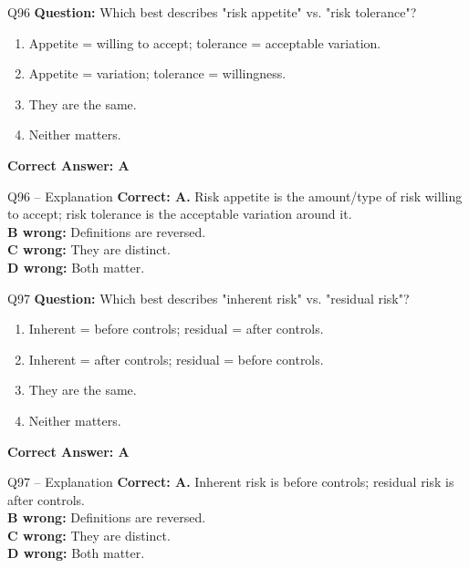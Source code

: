 \documentclass[aspectratio=169,10pt]{beamer}
\begin{document}
	\begin{frame}[t]{Q96}
		\small
		\textbf{Question:} Which best describes "risk appetite" vs. "risk tolerance"?
		\begin{enumerate}[label=\Alph*.,itemsep=1pt,topsep=2pt]
			\item Appetite = willing to accept; tolerance = acceptable variation.
			\item Appetite = variation; tolerance = willingness.
			\item They are the same.
			\item Neither matters.
		\end{enumerate}
		\vspace{4pt}
		\textbf{Correct Answer: A}
	\end{frame}
	
	\begin{frame}[t]{Q96 -- Explanation}
		\small
		\textbf{Correct: A.} Risk appetite is the amount/type of risk willing to accept; risk tolerance is the acceptable variation around it. \\[4pt]
		\textbf{B wrong:} Definitions are reversed. \\[2pt]
		\textbf{C wrong:} They are distinct. \\[2pt]
		\textbf{D wrong:} Both matter.
	\end{frame}
	
	\begin{frame}[t]{Q97}
		\small
		\textbf{Question:} Which best describes "inherent risk" vs. "residual risk"?
		\begin{enumerate}[label=\Alph*.,itemsep=1pt,topsep=2pt]
			\item Inherent = before controls; residual = after controls.
			\item Inherent = after controls; residual = before controls.
			\item They are the same.
			\item Neither matters.
		\end{enumerate}
		\vspace{4pt}
		\textbf{Correct Answer: A}
	\end{frame}
	
	\begin{frame}[t]{Q97 -- Explanation}
		\small
		\textbf{Correct: A.} Inherent risk is before controls; residual risk is after controls. \\[4pt]
		\textbf{B wrong:} Definitions are reversed. \\[2pt]
		\textbf{C wrong:} They are distinct. \\[2pt]
		\textbf{D wrong:} Both matter.
	\end{frame}
	
\end{document}
